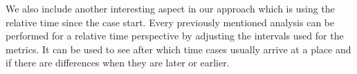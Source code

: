 We also include another interesting aspect in our approach which is using the relative time since the case start. Every previously mentioned analysis can be performed for a relative time perspective by adjusting the intervals used for the metrics. It can be used to see after which time cases usually arrive at a place and if there are differences when they are later or earlier.